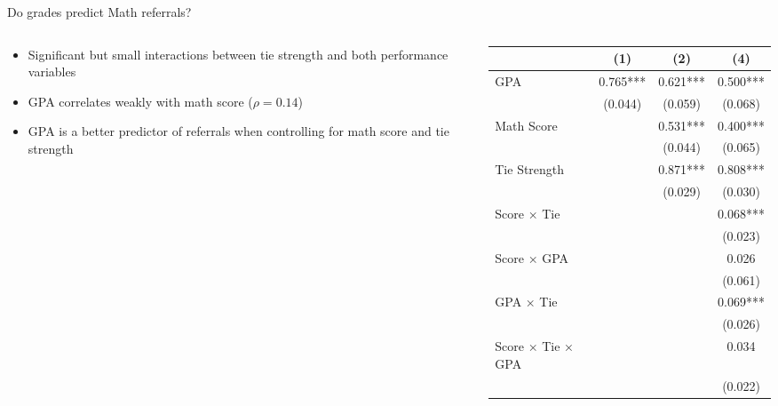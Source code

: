 \documentclass[aspectratio=169,xcolor=dvipsnames]{beamer}
\begin{document}
\begin{frame}{Do grades predict Math referrals?}
    \begin{columns}[T]
        \begin{column}{0.38\textwidth}
            \vspace{2em}
            \begin{itemize}
                \item Significant but small interactions between tie strength and both performance variables
                \item GPA correlates weakly with math score ($\rho = 0.14$)
                \item GPA is a better predictor of referrals when controlling for math score and tie strength
            \end{itemize}
        \end{column}
        \begin{column}{0.62\textwidth}
            \begin{table}
                \centering
                \footnotesize
                \begin{threeparttable}
                \begin{tabular*}{0.9\columnwidth}{@{\extracolsep{\fill}}lccc}
                \toprule
                 & \multicolumn{1}{c}{(1)} & \multicolumn{1}{c}{(2)} & \multicolumn{1}{c}{(4)} \\
                \midrule
                GPA & 0.765*** & 0.621*** & 0.500*** \\
                 & (0.044) & (0.059) & (0.068) \\
                Math Score &  & 0.531*** & 0.400*** \\
                 &  & (0.044) & (0.065) \\
                Tie Strength &  & 0.871*** & 0.808*** \\
                 &  & (0.029) & (0.030) \\
                Score × Tie &  &  & 0.068*** \\
                 &  &  & (0.023) \\
                Score × GPA &  &  & 0.026 \\
                 &  &  & (0.061) \\
                GPA × Tie &  &  & 0.069*** \\
                 &  &  & (0.026) \\
                Score × Tie × GPA &  &  & 0.034 \\
                 &  &  & (0.022) \\
                \bottomrule
                \end{tabular*}
                \label{tab:math_gpa_regression}
                \end{threeparttable}
            \end{table}
        \end{column}
    \end{columns}
\end{frame}
\end{document}
